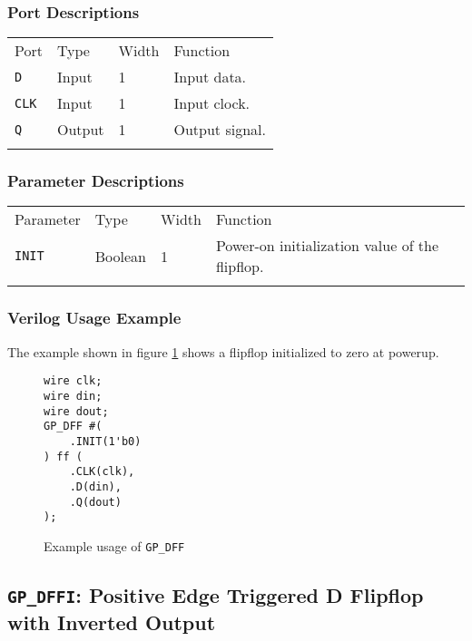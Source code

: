 \documentclass[11pt]{article}
\newcommand{\tokenstyle}[1]{\texttt{#1}}
\newcommand{\whenstyle}[1]{{\fontseries{sb}\selectfont#1}}
\newcommand{\thinhline}{\Xhline{1\arrayrulewidth}}
\newcommand{\thickhline}{\Xhline{2.5\arrayrulewidth}}
\begin{document}
\subsubsection{Port Descriptions}

\begin{tabularx}{\textwidth}{lllX}
\thinhline
\whenstyle{Port} & \whenstyle{Type} & \whenstyle{Width} & \whenstyle{Function} \\
\thickhline
\tokenstyle{D} & Input & 1 & Input data. \\
\thinhline
\tokenstyle{CLK} & Input & 1 & Input clock. \\
\thinhline
\tokenstyle{Q} & Output & 1 & Output signal. \\
\thinhline
\end{tabularx}

\subsubsection{Parameter Descriptions}

\begin{tabularx}{\textwidth}{lllX}
\thinhline
\whenstyle{Parameter} & \whenstyle{Type} & \whenstyle{Width} & \whenstyle{Function} \\
\thickhline
\tokenstyle{INIT} & Boolean & 1 & Power-on initialization value of the flipflop. \\
\thinhline
\end{tabularx}

\subsubsection{Verilog Usage Example}

The example shown in figure \ref{gp-dff-example} shows a flipflop initialized to zero at powerup.

\begin{figure}[h]
\begin{lstlisting}
wire clk;
wire din;
wire dout;
GP_DFF #(
	.INIT(1'b0)
) ff (
	.CLK(clk),
	.D(din),
	.Q(dout)
);
\end{lstlisting}
\caption{Example usage of \tokenstyle{GP\_DFF}}
\label{gp-dff-example}
\end{figure}


\pagebreak
\subsection{\tokenstyle{GP\_DFFI}: Positive Edge Triggered D Flipflop with Inverted Output}
\label{gp-dff}
\end{document}
